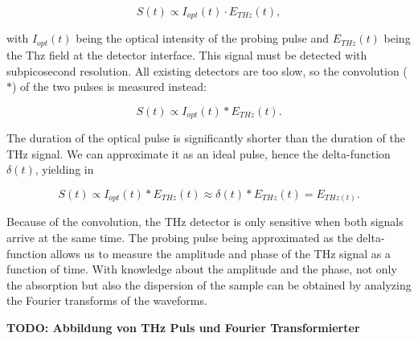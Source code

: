 \begin{equation}
	S(t) \propto I_{opt}(t)\cdot E_{THz}(t),
\end{equation}

with $I_{opt}(t)$ being the optical intensity of the probing pulse and $E_{THz}(t)$ being the Thz field at the detector interface. This signal must be detected with subpicosecond resolution. All existing detectors are too slow, so the convolution ($\ast$) of the two pulses is measured instead: 

\begin{equation}
	S(t) \propto I_{opt}(t) \ast E_{THz}(t).
\end{equation}

The duration of the optical pulse is significantly shorter than the duration of the THz signal. We can approximate it as an ideal pulse, hence the delta-function $\delta(t)$, yielding in

\begin{equation}
	S(t) \propto I_{opt}(t) \ast E_{THz}(t) \approx \delta(t) \ast E_{THz}(t) = E_{THz(t)}.
\end{equation}

Because of the convolution, the THz detector is only sensitive when both signals arrive at the same time. The probing pulse being approximated as the delta-function allows us to measure the amplitude and phase of the THz signal as a function of time. With knowledge about the amplitude and the phase, not only the absorption but also the dispersion of the sample can be obtained by analyzing the Fourier transforms of the waveforms. 


\textbf{TODO: Abbildung von THz Puls und Fourier Transformierter}